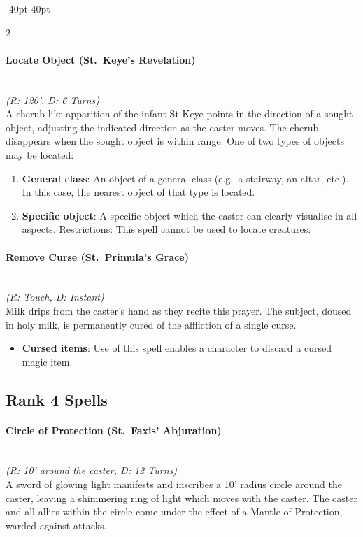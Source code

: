 \documentclass{book}
\providecommand{\tightlist}{%
\setlength{\itemsep}{0pt}\setlength{\parskip}{0pt}}
\begin{document}
\begin{adjustwidth}{-40pt}{-40pt}
\begin{multicols}{2}
\paragraph{Locate Object (St.~Keye's
	Revelation)}\label{locate-object-st.-keyes-revelation}\mbox{}\\
\emph{(R: 120', D: 6 Turns)}\\
A cherub-like apparition of the infant St Keye points in the direction
of a sought object, adjusting the indicated direction as the caster
moves. The cherub disappears when the sought object is within range. One
of two types of objects may be located:

\begin{enumerate}
	\def\labelenumi{\arabic{enumi}.}
	\tightlist
	\item
	\textbf{General class}: An object of a general class (e.g.~a stairway,
	an altar, etc.). In this case, the nearest object of that type is
	located.
	\item
	\textbf{Specific object}: A specific object which the caster can
	clearly visualise in all aspects. Restrictions: This spell cannot be
	used to locate creatures.
\end{enumerate}

\paragraph{Remove Curse (St.~Primula's
	Grace)}\label{remove-curse-st.-primulas-grace}\mbox{}\\
\emph{(R: Touch, D: Instant)}\\
Milk drips from the caster's hand as they recite this prayer. The
subject, doused in holy milk, is permanently cured of the affliction of
a single curse.

\begin{itemize}
	\tightlist
	\item
	\textbf{Cursed items}: Use of this spell enables a character to
	discard a cursed magic item.
\end{itemize}

\subsection*{Rank 4 Spells}\label{rank-4-holy}

\paragraph{Circle of Protection (St.~Faxis'
	Abjuration)}\label{circle-of-protection-st.-faxis-abjuration}\mbox{}\\
\emph{(R: 10' around the caster, D: 12 Turns)}\\
A sword of glowing light manifests and inscribes a 10' radius circle
around the caster, leaving a shimmering ring of light which moves with
the caster. The caster and all allies within the circle come under the
effect of a Mantle of Protection, warded against attacks.


\end{multicols}
\end{adjustwidth}
\end{document}
